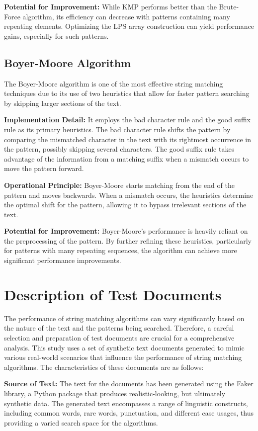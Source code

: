 \documentclass{article}
\begin{document}
\textbf{Potential for Improvement:}
While KMP performs better than the Brute-Force algorithm, its efficiency can decrease with patterns containing many repeating elements. Optimizing the LPS array construction can yield performance gains, especially for such patterns.

\subsection{Boyer-Moore Algorithm}

The Boyer-Moore algorithm is one of the most effective string matching techniques due to its use of two heuristics that allow for faster pattern searching by skipping larger sections of the text.

\textbf{Implementation Detail:}
It employs the bad character rule and the good suffix rule as its primary heuristics. The bad character rule shifts the pattern by comparing the mismatched character in the text with its rightmost occurrence in the pattern, possibly skipping several characters. The good suffix rule takes advantage of the information from a matching suffix when a mismatch occurs to move the pattern forward.

\textbf{Operational Principle:}
Boyer-Moore starts matching from the end of the pattern and moves backwards. When a mismatch occurs, the heuristics determine the optimal shift for the pattern, allowing it to bypass irrelevant sections of the text.

\textbf{Potential for Improvement:}
Boyer-Moore's performance is heavily reliant on the preprocessing of the pattern. By further refining these heuristics, particularly for patterns with many repeating sequences, the algorithm can achieve more significant performance improvements.

\section{Description of Test Documents}

The performance of string matching algorithms can vary significantly based on the nature of the text and the patterns being searched. Therefore, a careful selection and preparation of test documents are crucial for a comprehensive analysis. This study uses a set of synthetic text documents generated to mimic various real-world scenarios that influence the performance of string matching algorithms. The characteristics of these documents are as follows:

\textbf{Source of Text:}
The text for the documents has been generated using the Faker library, a Python package that produces realistic-looking, but ultimately synthetic data. The generated text encompasses a range of linguistic constructs, including common words, rare words, punctuation, and different case usages, thus providing a varied search space for the algorithms.
\end{document}
